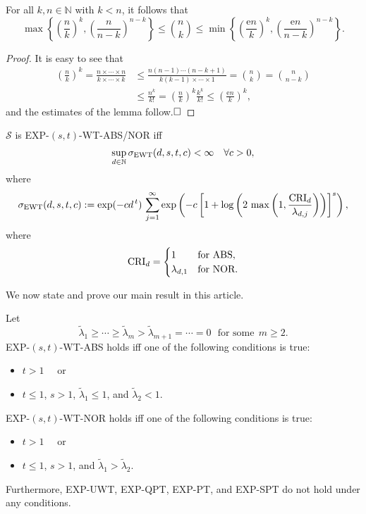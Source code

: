 \documentclass[graybox]{svmult}
\newcommand{\tlambda}{\widetilde{\lambda}}
\newcommand{\me}{\mathrm{e}}
\newcommand{\SEWT}{\sigma_{\textup{EWT}}}
\newcommand{\EXP}{\textup{EXP}\xspace}
\newcommand{\NOR}{\textup{NOR}\xspace}
\newcommand{\ABS}{\textup{ABS}\xspace}
\newcommand{\SPT}{\textup{SPT}\xspace}
\newcommand{\PT}{\textup{PT}\xspace}
\newcommand{\QPT}{\textup{QPT}\xspace}
\newcommand{\WT}{\textup{WT}\xspace}
\newcommand{\UWT}{\textup{UWT}\xspace}
\newcommand{\calS}{{\mathcal{S}}}
\newcommand{\N}{{\mathbb{N}}} %
\begin{document}
\begin{lemma} \label{binomBdLem} For all $k, n \in \N$ with $k < n$, it follows that
\begin{equation*}
      \max\left\{\left(\frac nk\right)^k,  \left(\frac n{n-k}\right)^{n-k} \right\}
      \le \binom{n}{k} \le \min\left\{\left(\frac {\me n}k\right)^k,  \left(\frac {\me n}{n-k}\right)^{n-k} \right\}.
\end{equation*}
\end{lemma}
\begin{proof}
It is easy to see that
                \begin{align*}
                \left(\frac nk\right)^k  = \frac{n \times \cdots \times n}{k \times \cdots \times k}
                & \le \frac{n (n-1) \cdots (n - k+1)}{k (k-1)\times \cdots \times 1}
                 =\binom{n}{k} = \binom{n}{n-k} \\
                & \le \frac{n^k}{k!} = \left(\frac nk\right)^k \frac{k^k}{k!} \le  \left(\frac {\me n}k\right)^k,
                \end{align*}
and the estimates of the lemma follow.$\hfill\Box$
\end{proof}

\begin{theorem} \cite{KW18} \label{thm:general}   
$\calS$ is \EXP-$(s,t)$-\WT-\ABS/\NOR iff   
\begin{equation}\label{eq:EXP-WT}   
\sup_{d\in\N} \SEWT (d,s,t,c)    
 < \infty\quad \forall c>0,   
\end{equation}   
where   
\[   
 \SEWT (d,s,t,c):=\exp (-cd^{\,t})\,\sum_{j=1}^\infty    
\exp \left(-c \left[   
1+   
\log\left(2\,\max\left(1,\frac{{\rm   
        CRI}_d}{\lambda_{d,j}}\right)\right)   
\right]^s \right),   
\]   
where 
$$   
 \mathrm{CRI}_d=\begin{cases}   
                 1 &\mbox{for $\ABS$},\\   
                 \lambda_{d,1} &\mbox{for $\NOR$}.   
                 \end{cases}   
$$  
\end{theorem}   



We now state and prove our main result in this article.
\begin{theorem}\label{thm:main}
Let
$$
\tlambda_1\ge\cdots\ge\tlambda_m>\tlambda_{m+1}=\cdots=0\ \ \
\mbox{for some}\ \ m\ge2.
$$
\EXP-$(s,t)$-\WT-\ABS holds iff one of the following conditions is true:
\begin{itemize}
\item $t>1$ \ \ \mbox{or}
\item $t\le 1$, $s>1$, $\tlambda_1\le1$, and $\tlambda_2<1$.
\end{itemize}
\EXP-$(s,t)$-\WT-\NOR holds iff one of the following conditions is true:
\begin{itemize}
\item $t>1$ \ \ \mbox{or}
\item $t\le 1$, $s>1$, and $\tlambda_1>\tlambda_2$.
\end{itemize}
Furthermore, \EXP-\UWT, \EXP-\QPT, \EXP-\PT, and \EXP-\SPT do not hold under any conditions.

\end{theorem}
\end{document}
